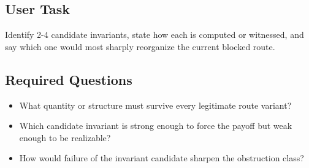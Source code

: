 \documentclass[11pt]{article}
\begin{document}
\subsection*{User Task}
Identify 2-4 candidate invariants, state how each is computed or witnessed, and say which one would most sharply reorganize the current blocked route.

\subsection*{Required Questions}
\begin{itemize}[leftmargin=*,itemsep=0.2em]
\item What quantity or structure must survive every legitimate route variant?
\item Which candidate invariant is strong enough to force the payoff but weak enough to be realizable?
\item How would failure of the invariant candidate sharpen the obstruction class?
\end{itemize}
\end{document}
